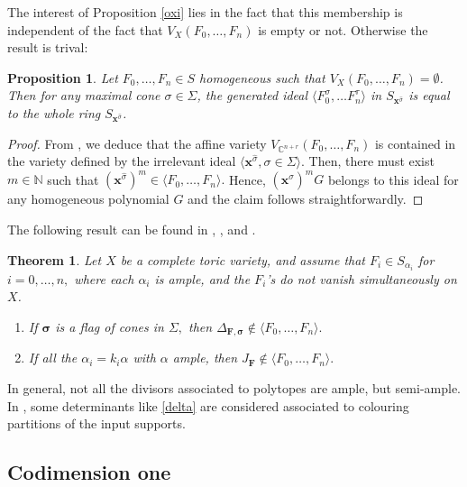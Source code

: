 \documentclass[a4paper,11pt]{amsart}
\newcommand{\C}{\mathbb{C}}
\newcommand{\N}{\mathbb{N}}
\newcommand{\bfx}{{\boldsymbol{x}}}
\newcommand{\bfsigma}{{\boldsymbol{\sigma}}}
\newcommand{\bfF}{{\boldsymbol{F}}}
\newcounter{thm}
\numberwithin{thm}{section}
\numberwithin{equation}{section}
\theoremstyle{definition}
\theoremstyle{plain}
\newtheorem{proposition}[thm]{Proposition}
\newtheorem{theorem}[thm]{Theorem}
\begin{document}
The interest of Proposition \ref{oxi} lies in the fact that this membership is independent of the fact that $V_X(F_0,\ldots, F_n)$ is empty or not. Otherwise the result is trival:
\begin{proposition}\label{goxi}
Let $F_0,\ldots, F_n\in S$ homogeneous such that $V_X(F_0,\ldots, F_n)=\emptyset$.  Then for any maximal cone $\sigma\in\Sigma$, the generated ideal $\langle F_0^\sigma,\ldots F_ n^\tau \rangle$ in $S_{\bfx^{\widehat{\sigma}}}$ is equal to the whole ring $S_{\bfx^{\widehat{\sigma}}}$.
\end{proposition}

\begin{proof}
From \cite[Prop.~5.2.8]{CLS11}, we deduce that  the affine variety $V_{\C^{n+r}}(F_0,\ldots, F_n)$ is contained in the variety defined by the irrelevant ideal $\langle \bfx^{\widehat{\sigma}}, \sigma\in\Sigma\rangle.$ Then,  there must exist $m\in\N$ such that  $(\bfx^{\widehat{\sigma}})^m\in\langle F_0,\ldots, F_n\rangle.$ Hence, $(\bfx^{\widehat{\sigma}})^mG$ belongs to this ideal for any homogeneous polynomial $G$ and the claim follows straightforwardly.
\end{proof} 

The following result can be found in \cite[Theorems 0.2 and 0.3]{CCD97}, \cite[Theorem 5.1]{cox96}, and \cite[Theorem 2.1]{CD05}.
\begin{theorem}\label{if} Let $X$ be a complete  toric variety, and assume that $F_i\in S_{\alpha_i}$ for $i=0,\ldots, n,$ where each $\alpha_i$ is  ample, and  the $F_i$'s do not vanish simultaneously on $X$. \begin{enumerate}
\item If $\bfsigma$ is a flag of cones in $\Sigma,$ then 
 $\Delta_{\bfF,\bfsigma}\notin \langle F_0,\ldots, F_n\rangle.$
\item If all the $\alpha_i=k_i\alpha$ with $\alpha$ ample, then  $J_\bfF\notin \langle F_0,\ldots, F_n\rangle.$
\end{enumerate}
\end{theorem}

In general, not all the divisors associated to polytopes are ample, but semi-ample. In \cite{KS05}, some determinants like \eqref{delta} are considered associated to colouring partitions of the input supports.





\subsection{Codimension one}\label{ssec:cod1}
\end{document}
